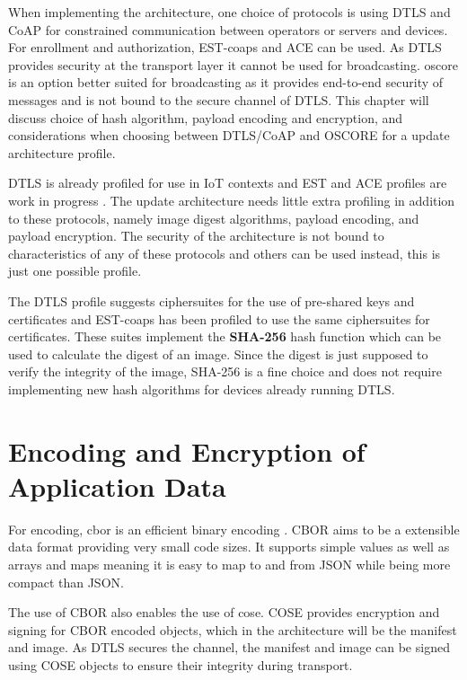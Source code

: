 \documentclass[0-thesis.tex]{subfiles}
\begin{document}
\label{chap:profiles}
When implementing the architecture, one choice of protocols is using DTLS and CoAP for
constrained communication between operators or servers and devices. For enrollment and
authorization, EST-coaps and ACE can be used. As DTLS provides security at the transport
layer it cannot be used for broadcasting. \gls{oscore} is an option better suited for
broadcasting as it provides end-to-end security of messages and is not bound to the secure
channel of DTLS. This chapter will discuss choice of hash algorithm, payload encoding and
encryption, and considerations when choosing between DTLS/CoAP and OSCORE for a update
architecture profile.

DTLS is already profiled for use in IoT contexts and EST and ACE profiles are work in
progress \parencite{rfc7925, est-coaps, ace-dtls-profile}. The update architecture needs
little extra profiling in addition to these protocols, namely image digest algorithms,
payload encoding, and payload encryption. The security of the architecture is not bound to
characteristics of any of these protocols and others can be used instead, this is just one
possible profile.

The DTLS profile suggests ciphersuites for the use of pre-shared keys and certificates and
EST-coaps has been profiled to use the same ciphersuites for certificates. These suites
implement the \textbf{SHA-256} hash function which can be used to calculate the digest of an image.
Since the digest is just supposed to verify the integrity of the image, SHA-256 is a fine
choice and does not require implementing new hash algorithms for devices already running
DTLS.

\section{Encoding and Encryption of Application Data}
\label{sec:encoding-encryption}
For encoding, \gls{cbor} is an efficient binary encoding \parencite{rfc7049}. CBOR aims to
be a extensible data format providing very small code sizes. It supports simple values as
well as arrays and maps meaning it is easy to map to and from JSON while being more
compact than JSON. 

The use of CBOR also enables the use of \gls{cose}. COSE provides encryption and signing
for CBOR encoded objects, which in the architecture will be the manifest and image. As
DTLS secures the channel, the manifest and image can be signed using COSE objects to
ensure their integrity during transport. 
\end{document}
